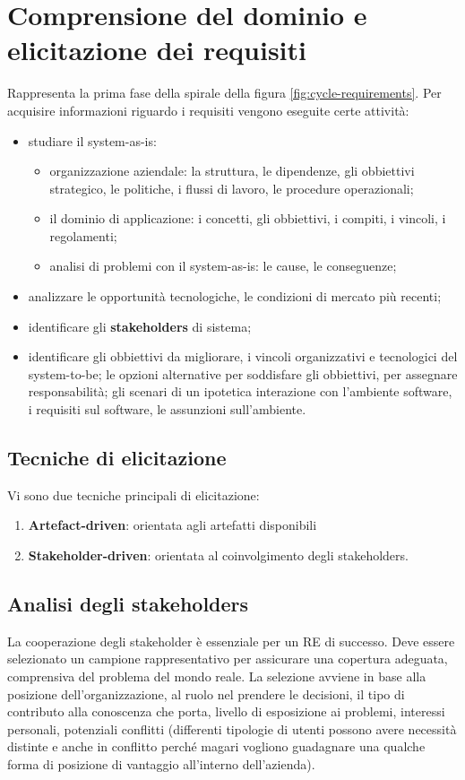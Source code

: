\section{Comprensione del dominio e elicitazione dei requisiti}
Rappresenta la prima fase della spirale della figura \ref{fig:cycle-requirements}.
Per acquisire informazioni riguardo i requisiti vengono eseguite certe attività:
\begin{itemize}
	\item studiare il system-as-is:
	\begin{itemize}
		\item organizzazione aziendale: la struttura, le dipendenze, gli obbiettivi strategico, le politiche, i flussi di lavoro, le procedure operazionali;
		\item il dominio di applicazione: i concetti, gli obbiettivi, i compiti, i vincoli, i regolamenti;
		\item analisi di problemi con il system-as-is: le cause, le conseguenze;
	\end{itemize}
	\item analizzare le opportunità tecnologiche, le condizioni di mercato più recenti;
	\item identificare gli \textbf{stakeholders} di sistema;
	\item identificare gli obbiettivi da migliorare, i vincoli organizzativi e tecnologici del system-to-be; le opzioni alternative per soddisfare gli obbiettivi, per assegnare responsabilità; gli scenari di un ipotetica interazione con l'ambiente software, i requisiti sul software, le assunzioni sull'ambiente.
\end{itemize}
\subsection{Tecniche di elicitazione}
Vi sono due tecniche principali di elicitazione:
\begin{enumerate}
	\item \textbf{Artefact-driven}: orientata agli artefatti disponibili
	\item \textbf{Stakeholder-driven}: orientata al coinvolgimento degli stakeholders.
\end{enumerate}
\subsection{Analisi degli stakeholders}
La cooperazione degli stakeholder è essenziale per un RE di successo. Deve essere selezionato un campione rappresentativo per assicurare una copertura adeguata, comprensiva del problema del mondo reale.
La selezione avviene in base alla posizione dell'organizzazione, al ruolo nel prendere le decisioni, il tipo di contributo alla conoscenza che porta, livello di esposizione ai problemi, interessi personali, potenziali conflitti (differenti tipologie di utenti possono avere necessità distinte e anche in conflitto perché magari vogliono guadagnare una qualche forma di posizione di vantaggio all'interno dell'azienda).

